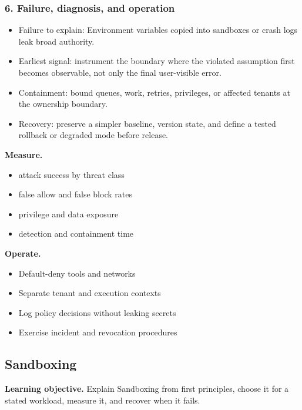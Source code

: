 \subsubsection*{6. Failure, diagnosis, and operation}
\begin{itemize}
\item Failure to explain: Environment variables copied into sandboxes or crash logs leak broad authority.
\item Earliest signal: instrument the boundary where the violated assumption first becomes observable, not only the final user-visible error.
\item Containment: bound queues, work, retries, privileges, or affected tenants at the ownership boundary.
\item Recovery: preserve a simpler baseline, version state, and define a tested rollback or degraded mode before release.
\end{itemize}
\textbf{Measure.}\begin{itemize}
\item attack success by threat class
\item false allow and false block rates
\item privilege and data exposure
\item detection and containment time
\end{itemize}
\textbf{Operate.}\begin{itemize}
\item Default-deny tools and networks
\item Separate tenant and execution contexts
\item Log policy decisions without leaking secrets
\item Exercise incident and revocation procedures
\end{itemize}
\subsection{Sandboxing}
\textbf{Learning objective.} Explain Sandboxing from first principles, choose it for a stated workload, measure it, and recover when it fails.
